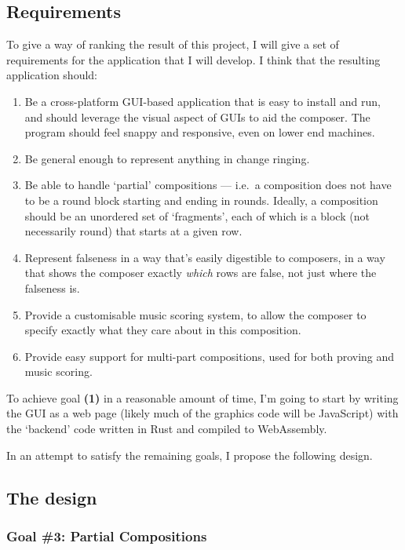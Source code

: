 \documentclass[12pt]{article}
\begin{document}
\subsection{Requirements}

To give a way of ranking the result of this project, I will give a set of requirements for the
application that I will develop.  I think that the resulting application should:

\begin{enumerate}
    \item Be a cross-platform GUI-based application that is easy to install and run, and should
        leverage the visual aspect of GUIs to aid the composer.  The program should feel snappy and
        responsive, even on lower end machines.
    \item Be general enough to represent anything in change ringing.
    \item Be able to handle `partial' compositions --- i.e.\ a composition does not have to be a
        round block starting and ending in rounds.  Ideally, a composition should be an unordered
        set of `fragments', each of which is a block (not necessarily round) that starts at a given
        row.
    \item Represent falseness in a way that's easily digestible to composers, in a way that shows
        the composer exactly \emph{which} rows are false, not just where the falseness is.
    \item Provide a customisable music scoring system, to allow the composer to specify exactly what
        they care about in this composition.
    \item Provide easy support for multi-part compositions, used for both proving and music scoring.
\end{enumerate}

To achieve goal \textbf{(1)} in a reasonable amount of time, I'm going to start by writing the GUI
as a web page (likely much of the graphics code will be JavaScript) with the `backend' code written
in Rust and compiled to WebAssembly.

\bigskip

\noindent In an attempt to satisfy the remaining goals, I propose the following design.

\subsection{The design}

\subsubsection{Goal \#3: Partial Compositions}
\end{document}
